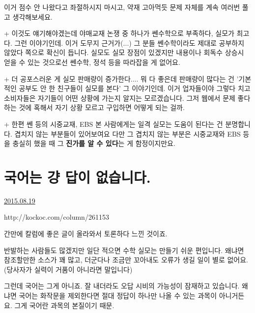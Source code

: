 이거 점수 안 나왔다고 좌절하시지 마시고, 약재 고아먹듯 문제 자체를 계속 여러번 풀고 생각해보세요.
\vspace{5mm}

+ 이것도 얘기해야겠는데 야매교재 논쟁 중 하나가
쎈수학으로 부족하다, 실모가 최고다. 그런 이야기인데. 이거 도무지 근거가(...)
그 분들 쎈수학이라도 제대로 공부하지 않았다 쪽으로 확신이 듭니다.
실모도 실모 장점이 있겠지만 내용이나 회독수 상승시 얻을 수 있는 것으로선 쎈수학, 정석 등을 따라잡을 게 없어요.
\vspace{5mm}

+ 더 공포스러운 게 실모 판매량이 증가한다.... 뭐 다 좋은데
판매량이 많다는 건 '기본적인 공부도 안 한 친구들이 실모를 본다' 그 이야기인데.
이거 업자들이야 그렇다 치고 소비자들은 자기들이 어떤 상황에 가는지 알지는 모르겠습니다.
그저 웹에서 문제 좋다 하는 것에 혹해서 자기 상황 모르고 구입하면 어떻게 되는 걸까.
\vspace{5mm}

+ 한편 쎈 등의 시중교재, EBS 본 사람에게는 일격 실모는 도움이 된다는 건 분명합니다.  겹치지 않는 부분들이 있어보여요
다만 그 겹치지 않는 부분은 시중교재와 EBS 등을 충실히 했을 때 그 \textbf{진가를 알 수 있다}는 게 함정이지만요.
\vspace{5mm}







\section{국어는 걍 답이 없습니다.}
\href{https://www.kockoc.com/Apoc/261711}{2015.08.19}

\vspace{5mm}

http://kockoc.com/column/261153
\vspace{5mm}

간만에 칼럼에 좋은 글이 올라와서 토론하다 느낀 것이죠.
\vspace{5mm}

반발하는 사람들도 많겠지만 일단 적으면
수학 실모는 만들기 쉬운 편입니다. 왜냐면 참조할만한 소스가 꽤 많고, 더군다나 조금만 꼬아내도 오류가 생길 일이 별로 없어요.
(당사자가 실력이 거품이 아니라면 말입니다)
\vspace{5mm}

그런데 국어는 그게 아니죠. 잘 내더라도 오답 시비의 가능성이 잠재하고 있습니다.
왜냐면 국어는 화작문을 제외한다면 절대 정답이 하나만 나올 수 있는 과목이 아니거든요.
그게 국어란 과목의 본질이기 때문.
\vspace{5mm}

